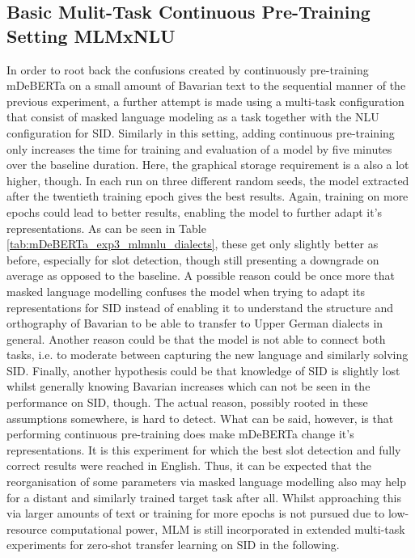 \documentclass[11pt,a4paper,twoside,openright]{scrbook}
\begin{document}
\subsection{Basic Mulit-Task Continuous Pre-Training Setting MLMxNLU}

In order to root back the confusions created by continuously pre-training mDeBERTa on a small amount of Bavarian text to the sequential manner of the previous experiment, a further attempt is made using a multi-task configuration that consist of masked language modeling as a task together with the NLU configuration for SID. Similarly in this setting, adding continuous pre-training only increases the time for training and evaluation of a model by five minutes over the baseline duration. Here, the graphical storage requirement is a also a lot higher, though. In each run on three different random seeds, the model extracted after the twentieth training epoch gives the best results. Again, training on more epochs could lead to better results, enabling the model to further adapt it's representations. As can be seen in Table \ref{tab:mDeBERTa_exp3_mlmnlu_dialects}, these get only slightly better as before, especially for slot detection, though still presenting a downgrade on average as opposed to the baseline. A possible reason could be once more that masked language modelling confuses the model when trying to adapt its representations for SID instead of enabling it to understand the structure and orthography of Bavarian to be able to transfer to Upper German dialects in general. Another reason could be that the model is not able to connect both tasks, i.e. to moderate between capturing the new language and similarly solving SID. Finally, another hypothesis could be that knowledge of SID is slightly lost whilst generally knowing Bavarian increases which can not be seen in the performance on SID, though. The actual reason, possibly rooted in these assumptions somewhere, is hard to detect. What can be said, however, is that performing continuous pre-training does make mDeBERTa change it's representations. It is this experiment for which the best slot detection and fully correct results were reached in English. Thus, it can be expected that the reorganisation of some parameters via masked language modelling also may help for a distant and similarly trained target task after all. Whilst approaching this via larger amounts of text or training for more epochs is not pursued due to low-resource computational power, MLM is still incorporated in extended multi-task experiments for zero-shot transfer learning on SID in the following.
\end{document}
